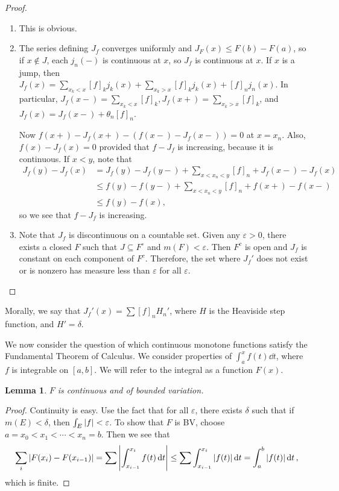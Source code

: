 \documentclass[leqno, openany]{memoir}
\newtheorem{lem}[thm]{Lemma}
\theoremstyle{definition}
\theoremstyle{remark}
\theoremstyle{plain}
\theoremstyle{definition}
\theoremstyle{remark}
\newcommand{\ep}{\varepsilon}
\begin{document}
\begin{proof} \begin{enumerate} \item This is obvious.  \item The series
    defining $J_f$ converges uniformly and $J_F(x) \leq F(b) - F(a)$, so if $x
    \notin J$, each $j_n(-)$ is continuous at $x$, so $J_f$ is continuous at
    $x$. If $x$ is a jump, then $J_f(x) = \sum_{x_k < x} [f]_k j_k(x) +
    \sum_{x_k > x} [f]_k j_k(x) + [f]_n j_n(x)$. In particular, $J_f(x-) =
    \sum_{x_k < x} [f]_k, J_f(x+) = \sum_{x_k > x} [f]_k$, and $J_f(x) =
    J_f(x-) + \theta_n [f]_n$.

            Now $f(x+) - J_f(x+) - (f(x-) - J_f(x-)) = 0$ at $x = x_n$. Also,
            $f(x) - J_f(x) = 0$ provided that $f - J_f$ is increasing, because
            it is continuous. If $x < y$, note that \begin{align*} J_f(y) -
                J_f(x) &= J_f(y) - J_f(y-) + \sum_{x < x_n < y} [f]_n + J_f(x-)
                - J_f(x) \\ &\leq f(y) - f(y-) + \sum_{x < x_n < y} [f]_n +
            f(x+) - f(x-) \\ &\leq f(y) - f(x), \end{align*} so we see that $f
            - J_f$ is increasing.  \item Note that $J_f$ is discontinuous on a
            countable set. Given any $\ep > 0$, there exists a closed $F$ such
            that $J \subseteq F^{\circ}$ and $m(F) < \ep$. Then $F^c$ is open
            and $J_f$ is constant on each component of $F^c$. Therefore, the
            set where $J_f'$ does not exist or is nonzero has measure less than
            $\ep$ for all $\ep$. \qedhere \end{enumerate} \end{proof}

Morally, we say that $J_f'(x) = \sum [f]_n H_n'$, where $H$ is the Heaviside
step function, and $H' = \delta$.

We now consider the question of which continuous monotone functions satisfy the
Fundamental Theorem of Calculus. We consider properties of $\int_a^x f(t)
\dd{t}$, where $f$ is integrable on $[a,b]$. We will refer to the integral as a
function $F(x)$.

\begin{lem} $F$ is continuous and of bounded variation.  \end{lem}

\begin{proof} Continuity is easy. Use the fact that for all $\ep$, there exists
    $\delta$ such that if $m(E) < \delta$, then $\int_E \abs{f} < \ep$. To show
    that $F$ is BV, choose $a = x_0 < x_1 < \cdots < x_n = b$. Then we see that
    \[ \sum_i \abs{F(x_i) - F(x_{i-1})} = \sum \abs{\int_{x_{i-1}}^{x_i} f(t)
    \dd{t}} \leq \sum \int_{x_{i-1}}^{x_i} \abs{f(t)} \dd{t} = \int_a^b
\abs{f(t)} \dd{t}, \] which is finite.  \end{proof}
\end{document}
